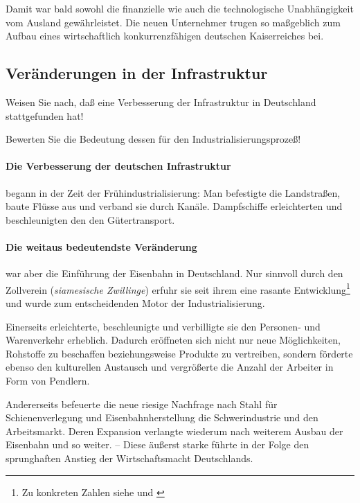 Damit war bald sowohl die finanzielle wie auch die technologische
Unabhängigkeit vom Ausland gewährleistet. Die neuen Unternehmer trugen
so maßgeblich zum Aufbau eines wirtschaftlich konkurrenzfähigen
deutschen Kaiserreiches bei.


\subsection[Veränderungen in der Infrastruktur]
{Veränderungen in der Infrastruktur }

\begin{aufgabe}
Weisen Sie nach, daß eine Verbesserung der Infrastruktur in
Deutschland stattgefunden hat!

Bewerten Sie die Bedeutung dessen für den Industrialisierungsprozeß!
\end{aufgabe}

\paragraph{Die Verbesserung der deutschen Infrastruktur} begann in der
Zeit der Frühindustrialisierung: Man befestigte die Landstraßen, baute
Flüsse aus und verband sie durch Kanäle. Dampfschiffe erleichterten
und beschleunigten den den Gütertransport.

\paragraph{Die weitaus bedeutendste Veränderung} war aber die
Einführung der Eisenbahn  in Deutschland. Nur
sinnvoll durch den Zollverein (\emph{siamesische Zwillinge}) erfuhr
sie seit ihrem  eine rasante
Entwicklung\footnote{Zu konkreten Zahlen siehe
\cite[159]{braunesGeschichts} und \cite{WikEisenbahn}} und wurde zum
entscheidenden Motor der Industrialisierung.

Einerseits erleichterte, beschleunigte und verbilligte sie den
Personen- und Warenverkehr erheblich. Dadurch eröffneten sich nicht
nur neue Möglichkeiten, Rohstoffe zu beschaffen beziehungsweise
Produkte zu vertreiben, sondern förderte ebenso den kulturellen
Austausch und vergrößerte die Anzahl der Arbeiter in Form von
Pendlern.

Andererseits befeuerte die neue riesige Nachfrage nach Stahl für
Schienenverlegung und Eisenbahnherstellung die Schwerindustrie und den
Arbeitsmarkt. Deren Expansion verlangte wiederum nach weiterem Ausbau
der Eisenbahn und so weiter. -- Diese äußerst starke
 führte in der Folge den sprunghaften Anstieg der
Wirtschaftsmacht Deutschlands.



